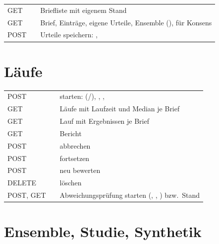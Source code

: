 \documentclass[11pt,a4paper,parskip=half-,headings=standardclasses,toc=bibliography,open=any]{scrreprt}
\begin{document}
\begin{longtable}{@{}P{1.2cm}P{6.2cm}p{7.0cm}@{}}
\toprule
\endhead
GET &  & Briefliste mit eigenem Stand\\
GET &  & Brief, Einträge, eigene Urteile, Ensemble (), für Konsens \\
POST &  & Urteile speichern: , \\
\bottomrule
\end{longtable}

\section{Läufe}

\begin{longtable}{@{}P{1.2cm}P{6.2cm}p{7.0cm}@{}}
\toprule
\endhead
POST &  & starten:  (/), , , \\
GET &  & Läufe mit Laufzeit und Median je Brief\\
GET &  & Lauf mit Ergebnissen je Brief\\
GET &  & Bericht\\
POST &  & abbrechen\\
POST &  & fortsetzen\\
POST &  & neu bewerten\\
DELETE &  & löschen\\
POST, GET &  & Abweichungsprüfung starten (, , ) bzw.\ Stand\\
\bottomrule
\end{longtable}

\section{Ensemble, Studie, Synthetik}
\end{document}

